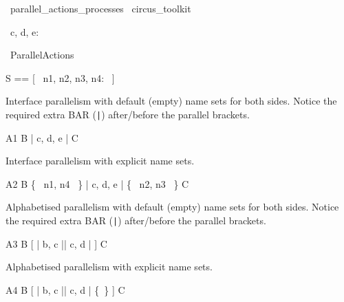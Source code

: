 \begin{zsection}
  \SECTION\ parallel\_actions\_processes \parents\ circus\_toolkit
\end{zsection}

\begin{circus}
   \circchannel\ c, d, e: \nat 
\end{circus}

\begin{circus}
   \circprocess\ ParallelActions \circdef \circbegin
\end{circus}


\begin{circusaction}
   \circstate S == [~ n1, n2, n3, n4: \nat ~]
\end{circusaction}

Interface parallelism with default (empty) name sets for both sides.
Notice the required extra BAR (\verb'|') after/before the parallel brackets.
%
\begin{circusaction}
   A1 \circdef B \lpar | \lchanset c, d, e \rchanset | \rpar C
\end{circusaction}

Interface parallelism with explicit name sets.
%
\begin{circusaction}
   A2 \circdef B \lpar \{~ n1, n4 ~\} | \lchanset c, d, e \rchanset | \{~ n2, n3 ~\} \rpar C
\end{circusaction}

Alphabetised parallelism with default (empty) name sets for both sides.
Notice the required extra BAR (\verb'|') after/before the parallel brackets.
%
\begin{circusaction}
   A3 \circdef B [ | \lchanset b, c \rchanset || \lchanset c, d \rchanset | ] C
\end{circusaction}

Alphabetised parallelism with explicit name sets.
%
\begin{circusaction}
   A4 \circdef B [ \emptyset | \lchanset b, c \rchanset || \lchanset c, d \rchanset | \{~\} ] C
\end{circusaction}


\begin{circusaction}
    \circspot \Skip
\end{circusaction}

\begin{circus}
    \circend
\end{circus}